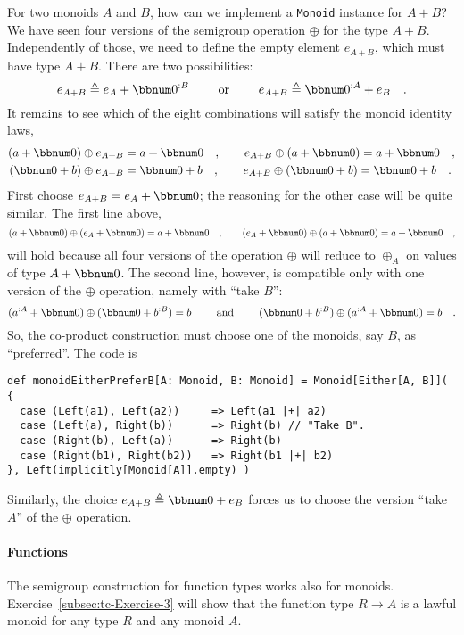 For two monoids $A$ and $B$, how can we implement a \lstinline!Monoid!
instance for $A+B$? We have seen four versions of the semigroup operation
$\oplus$ for the type $A+B$. Independently of those, we need to
define the empty element $e_{A+B}$, which must have type $A+B$.
There are two possibilities: 
\[
e_{A+B}\triangleq e_{A}+\bbnum 0^{:B}\quad\quad\text{ or }\quad\quad e_{A+B}\triangleq\bbnum 0^{:A}+e_{B}\quad.
\]
It remains to see which of the eight combinations will satisfy the
monoid identity laws,
\begin{align*}
\left(a+\bbnum 0\right)\oplus e_{A+B} & =a+\bbnum 0\quad,\quad\quad e_{A+B}\oplus\left(a+\bbnum 0\right)=a+\bbnum 0\quad,\\
\left(\bbnum 0+b\right)\oplus e_{A+B} & =\bbnum 0+b\quad,\quad\quad e_{A+B}\oplus\left(\bbnum 0+b\right)=\bbnum 0+b\quad.
\end{align*}
First choose $e_{A+B}=e_{A}+\bbnum 0$; the reasoning for the other
case will be quite similar. The first line above,
\[
\left(a+\bbnum 0\right)\oplus\left(e_{A}+\bbnum 0\right)=a+\bbnum 0\quad,\quad\quad\left(e_{A}+\bbnum 0\right)\oplus\left(a+\bbnum 0\right)=a+\bbnum 0\quad,
\]
will hold because all four versions of the operation $\oplus$ will
reduce to $\oplus_{A}$ on values of type $A+\bbnum 0$. The second
line, however, is compatible only with one version of the $\oplus$
operation, namely with \textsf{``}take $B$\textsf{''}:
\[
(a^{:A}+\bbnum 0)\oplus(\bbnum 0+b^{:B})=b\quad\quad\text{ and }\quad\quad(\bbnum 0+b^{:B})\oplus(a^{:A}+\bbnum 0)=b\quad.
\]
So, the co-product construction must choose one of the monoids, say
$B$, as \textsf{``}preferred\textsf{''}. The code is
\begin{lstlisting}
def monoidEitherPreferB[A: Monoid, B: Monoid] = Monoid[Either[A, B]]( {
  case (Left(a1), Left(a2))     => Left(a1 |+| a2)
  case (Left(a), Right(b))      => Right(b) // "Take B".
  case (Right(b), Left(a))      => Right(b)
  case (Right(b1), Right(b2))   => Right(b1 |+| b2)
}, Left(implicitly[Monoid[A]].empty) )
\end{lstlisting}
Similarly, the choice $e_{A+B}\triangleq\bbnum 0+e_{B}$ forces us
to choose the version \textsf{``}take $A$\textsf{''} of the $\oplus$ operation.

\paragraph{Functions}

The semigroup construction for function types works also for monoids.
Exercise~\ref{subsec:tc-Exercise-3} will show that the function
type $R\rightarrow A$ is a lawful monoid for any type $R$ and any
monoid $A$.

